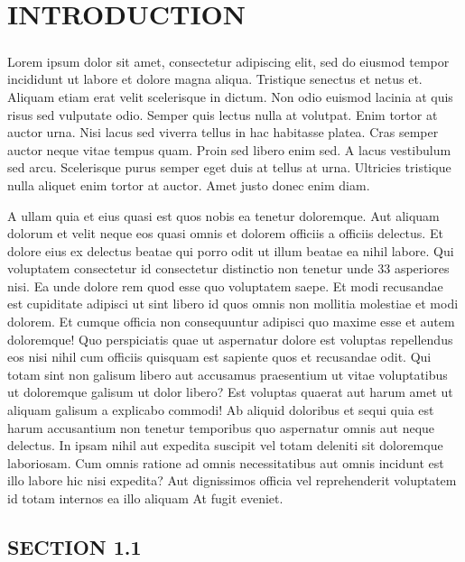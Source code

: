 \documentclass[a4paper,12pt]{report}
\begin{document}
\renewcommand\chaptername{CHAPTER}
\newpage
\chapter{INTRODUCTION}
\paragraph{}
Lorem ipsum dolor sit amet, consectetur adipiscing elit, sed do eiusmod tempor incididunt ut labore et dolore magna aliqua. Tristique senectus et netus et. Aliquam etiam erat velit scelerisque in dictum. Non odio euismod lacinia at quis risus sed vulputate odio. Semper quis lectus nulla at volutpat. Enim tortor at auctor urna. Nisi lacus sed viverra tellus in hac habitasse platea. Cras semper auctor neque vitae tempus quam. Proin sed libero enim sed. A lacus vestibulum sed arcu. Scelerisque purus semper eget duis at tellus at urna. Ultricies tristique nulla aliquet enim tortor at auctor. Amet justo donec enim diam.
\par A ullam quia et eius quasi est quos nobis ea tenetur doloremque. Aut aliquam dolorum et velit neque eos quasi omnis et dolorem officiis a officiis delectus. Et dolore eius ex delectus beatae qui porro odit ut illum beatae ea nihil labore. Qui voluptatem consectetur id consectetur distinctio non tenetur unde 33 asperiores nisi. Ea unde dolore rem quod esse quo voluptatem saepe. Et modi recusandae est cupiditate adipisci ut sint libero id quos omnis non mollitia molestiae et modi dolorem. Et cumque officia non consequuntur adipisci quo maxime esse et autem doloremque! Quo perspiciatis quae ut aspernatur dolore est voluptas repellendus eos nisi nihil cum officiis quisquam est sapiente quos et recusandae odit. Qui totam sint non galisum libero aut accusamus praesentium ut vitae voluptatibus ut doloremque galisum ut dolor libero? Est voluptas quaerat aut harum amet ut aliquam galisum a explicabo commodi! Ab aliquid doloribus et sequi quia est harum accusantium non tenetur temporibus quo aspernatur omnis aut neque delectus. In ipsam nihil aut expedita suscipit vel totam deleniti sit doloremque laboriosam. Cum omnis ratione ad omnis necessitatibus aut omnis incidunt est illo labore hic nisi expedita? Aut dignissimos officia vel reprehenderit voluptatem id totam internos ea illo aliquam At fugit eveniet. 
\section{SECTION 1.1}
\end{document}
